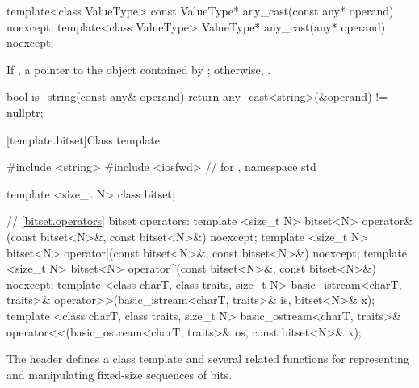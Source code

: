 \begin{itemdecl}
template<class ValueType>
  const ValueType* any_cast(const any* operand) noexcept;
template<class ValueType>
  ValueType* any_cast(any* operand) noexcept;
\end{itemdecl}

\begin{itemdescr}
\pnum
\returns
If ,
a pointer to the object contained by ;
otherwise, .

\pnum
\enterexample
\begin{codeblock}
bool is_string(const any& operand) {
  return any_cast<string>(&operand) != nullptr;
}
\end{codeblock}
\exitexample
\end{itemdescr}

[template.bitset]{Class template }%

%

\begin{codeblock}
#include <string>
#include <iosfwd>               // for , 
namespace std {
  template <size_t N> class bitset;

  // \ref{bitset.operators} bitset operators:
  template <size_t N>
    bitset<N> operator&(const bitset<N>&, const bitset<N>&) noexcept;
  template <size_t N>
    bitset<N> operator|(const bitset<N>&, const bitset<N>&) noexcept;
  template <size_t N>
    bitset<N> operator^(const bitset<N>&, const bitset<N>&) noexcept;
  template <class charT, class traits, size_t N>
    basic_istream<charT, traits>&
    operator>>(basic_istream<charT, traits>& is, bitset<N>& x);
  template <class charT, class traits, size_t N>
    basic_ostream<charT, traits>&
    operator<<(basic_ostream<charT, traits>& os, const bitset<N>& x);
}
\end{codeblock}

\pnum
The header
defines a
class template
and several related functions for representing
and manipulating fixed-size sequences of bits.


